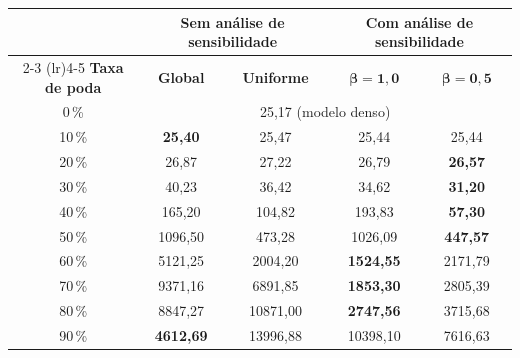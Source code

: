 \begin{tabular}{c cc cc}
\toprule
& \multicolumn{2}{c}{\textbf{Sem análise de sensibilidade}} & \multicolumn{2}{c}{\textbf{Com análise de sensibilidade}} \\
\cmidrule(lr){2-3} \cmidrule(lr){4-5}
\textbf{Taxa de poda} & \textbf{Global} & \textbf{Uniforme} & $\boldsymbol{\beta = 1{,}0}$ & $\boldsymbol{\beta = 0{,}5}$ \\
\midrule
0\,\% & \multicolumn{4}{c}{25,17 (modelo denso)} \\
10\,\% & \textbf{25,40} & 25,47 & 25,44 & 25,44 \\
20\,\% & 26,87 & 27,22 & 26,79 & \textbf{26,57} \\
30\,\% & 40,23 & 36,42 & 34,62 & \textbf{31,20} \\
40\,\% & 165,20 & 104,82 & 193,83 & \textbf{57,30} \\
50\,\% & 1096,50 & 473,28 & 1026,09 & \textbf{447,57} \\
60\,\% & 5121,25 & 2004,20 & \textbf{1524,55} & 2171,79 \\
70\,\% & 9371,16 & 6891,85 & \textbf{1853,30} & 2805,39 \\
80\,\% & 8847,27 & 10871,00 & \textbf{2747,56} & 3715,68 \\
90\,\% & \textbf{4612,69} & 13996,88 & 10398,10 & 7616,63 \\
\bottomrule
\end{tabular}
